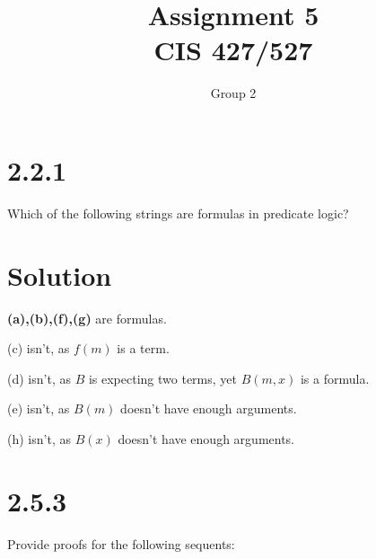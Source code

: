 \documentclass[10pt]{article}
\begin{document}
\title{Assignment \raisebox{.22ex}{\large\#}5 \\
	CIS 427/527}
\author{Group 2}

\maketitle

\section*{2.2.1}
Which of the following strings are formulas in predicate logic?
\section*{Solution}
\textbf{(a),(b),(f),(g)} are formulas.
\begin{description*}
\item[(c)] isn't, as $f(m)$ is a term.
\item[(d)] isn't, as $B$ is expecting two terms, yet $B(m,x)$ is a formula.
\item[(e)] isn't, as $B(m)$ doesn't have enough arguments.
\item[(h)] isn't, as $B(x)$ doesn't have enough arguments.
\end{description*}
\section*{2.5.3}
Provide proofs for the following sequents:
\end{document}
